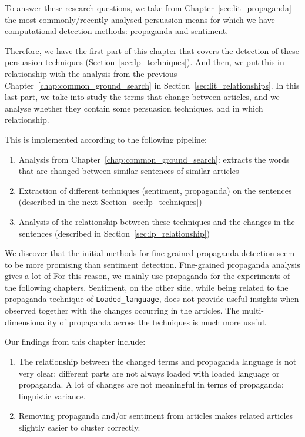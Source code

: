 
To answer these research questions, we take from Chapter~\ref{sec:lit_propaganda} the most commonly/recently analysed \gls{persuasion} means for which we have computational detection methods: \gls{propaganda} and \gls{sentiment}.

Therefore, we have the first part of this chapter that covers the detection of these persuasion techniques (Section~\ref{sec:lp_techniques}).
And then, we put this in relationship with the analysis from the previous Chapter~\ref{chap:common_ground_search} in Section~\ref{sec:lit_relationships}.
In this last part, 
we take into study the terms that change between articles, and we analyse whether they contain some persuasion techniques, and in which relationship. %

This is implemented according to the following pipeline:
\begin{enumerate}
    \item Analysis from Chapter~\ref{chap:common_ground_search}: extracts the words that are changed between similar sentences of similar articles
    \item Extraction of different techniques (sentiment, propaganda) on the sentences (described in the next Section~\ref{sec:lp_techniques})
    \item Analysis of the relationship between these techniques and the changes in the sentences (described in Section~\ref{sec:lp_relationship})
\end{enumerate}


We discover that
the initial methods for fine-grained propaganda detection seem to be more promising than sentiment detection.
Fine-grained propaganda analysis gives a lot of
For this reason, we mainly use propaganda for the experiments of the following chapters. 
Sentiment, on the other side, while being related to the propaganda technique of \texttt{Loaded\_language}, does not provide useful insights when observed together with the changes occurring in the articles. The multi-dimensionality of propaganda across the techniques is much more useful.

Our findings from this chapter include:
\begin{enumerate}
    \item The relationship between the changed terms and propaganda language is not very clear: different parts are not always loaded with loaded language or propaganda. A lot of changes are not meaningful in terms of propaganda: linguistic variance.
    \item Removing propaganda and/or sentiment from articles makes related articles slightly easier to cluster correctly.
\end{enumerate}

